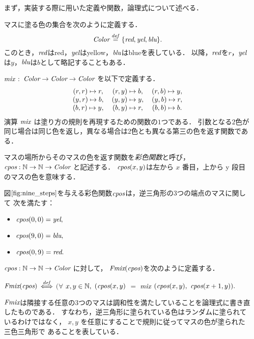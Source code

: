 まず，実装する際に用いた定義や関数，論理式について述べる．
\begin{dfn}[$\Color$]\rm
  マスに塗る色の集合を次のように定義する．
  \[
  \textit{Color} \overset{{\it def}}{=} \{\textit{red}, \textit{yel}, \textit{blu}\}.
  \]
  このとき，$\textit{red}$は{\rm{red}}，$\textit{yel}$は{\rm{yellow}}，$\textit{blu}$は{\rm{blue}}を表している．
  以降，$\textit{red}$を$r$，$\textit{yel}$は$y$，$\textit{blu}$は$b$として略記することもある．
\end{dfn}
\begin{dfn}[$\mix$]\rm
  $\mix$ $:$ $\textit{Color} \to \textit{Color} \to \textit{Color}$ を以下で定義する．
  \[
  \begin{tabular}{ccccc}
    $(r,r) \Pto r,$ & $(r,y) \Pto b,$ & $(r,b) \Pto y,$ \\
    $(y,r) \Pto b,$ & $(y,y) \Pto y,$ & $(y,b) \Pto r,$ \\
    $(b,r) \Pto y,$ & $(b,y) \Pto r,$ & $(b,b) \Pto b.$ \\
  \end{tabular}
  \]
  演算 $\mix$ は塗り方の規則を再現するための関数の$1$つである．
  引数となる$2$色が同じ場合は同じ色を返し，異なる場合は$2$色とも異なる第三の色を返す関数である．
\end{dfn}
\begin{dfn}[彩色関数]\rm
  マスの場所からそのマスの色を返す関数を{\em 彩色関数}と呼び，
  $\textit{cpos} : \mathbb{N} \to \mathbb{N} \to \textit{Color}$ と記述する．
  $\textit{cpos}(x,y)$は左から $x$ 番目，上から y 段目のマスの色を意味する．
\end{dfn}
\begin{exm}
  図$\ref{fig:nine_steps}$を与える彩色関数$\textit{cpos}$は，逆三角形の$3$つの端点のマスに関して
  次を満たす：
  \begin{itemize}
    \item $\textit{cpos}(0,0) = \textit{yel},$
    \item $\textit{cpos}(9,0) = \textit{blu},$
    \item $\textit{cpos}(0,9) = \textit{red}.$
  \end{itemize}
\end{exm}
\begin{dfn}[$\Fmix$]\rm
  $\textit{cpos} : \mathbb{N} \to \mathbb{N} \to \textit{Color}$ に対して，
  $\textit{Fmix}(\textit{cpos})$を次のように定義する．

  $\textit{Fmix}(\textit{cpos})$ $\overset{{\it def}}{\Longleftrightarrow}$
  $(\forall$ $x,y \in\mathbb{N},$
  $(\textit{cpos}(x,y)$ $=$ $\mix$ $(\textit{cpos}(x,y),$ $\textit{cpos}(x+1,y)).$

  $\Fmix$は隣接する任意の$3$つのマスは調和性を満たしていることを論理式に書き直したものである．
  すなわち，逆三角形に塗られている色はランダムに塗られているわけではなく，
  $x,y$ を任意にすることで規則に従ってマスの色が塗られた三色三角形で
  あることを表している．
\end{dfn}

